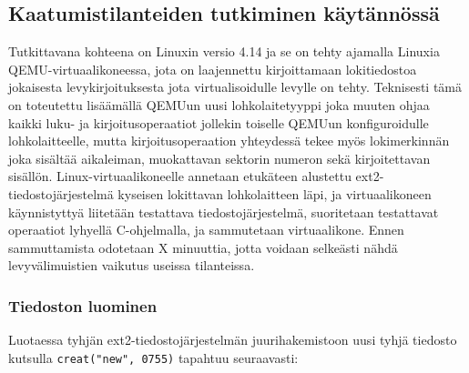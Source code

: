 \subsection{Kaatumistilanteiden tutkiminen käytännössä}

Tutkittavana kohteena on Linuxin versio 4.14 ja se on tehty ajamalla Linuxia QEMU-virtuaalikoneessa,
jota on laajennettu kirjoittamaan lokitiedostoa jokaisesta levykirjoituksesta jota virtualisoidulle levylle on tehty.
Teknisesti tämä on toteutettu lisäämällä QEMUun uusi lohkolaitetyyppi joka muuten ohjaa kaikki luku- ja kirjoitusoperaatiot jollekin toiselle QEMUun konfiguroidulle lohkolaitteelle,
mutta kirjoitusoperaation yhteydessä tekee myös lokimerkinnän joka sisältää aikaleiman, muokattavan sektorin numeron sekä kirjoitettavan sisällön.
Linux-virtuaalikoneelle annetaan etukäteen alustettu ext2-tiedostojärjestelmä kyseisen lokittavan lohkolaitteen läpi,
ja virtuaalikoneen käynnistyttyä liitetään testattava tiedostojärjestelmä,
suoritetaan testattavat operaatiot lyhyellä C-ohjelmalla,
ja sammutetaan virtuaalikone.
Ennen sammuttamista odotetaan X minuuttia,
jotta voidaan selkeästi nähdä levyvälimuistien vaikutus useissa tilanteissa.

\subsubsection{Tiedoston luominen}
Luotaessa tyhjän ext2-tiedostojärjestelmän juurihakemistoon uusi tyhjä tiedosto kutsulla \texttt{creat("new", 0755)} tapahtuu seuraavasti:

